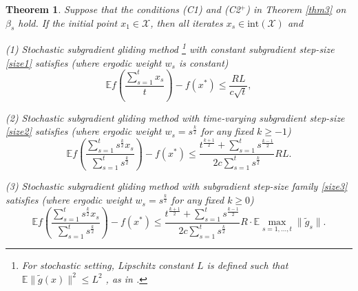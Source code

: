 \documentclass[sn-mathphys]{JORSC-jnl}%
\theoremstyle{thmstyleone}%
\newtheorem{theorem}{Theorem}[section]%
\theoremstyle{thmstylethree}%
\begin{document}
\begin{theorem}\label{thm5}
	Suppose that the conditions (C1) and (C2$^+$) in Theorem \ref{thm3} on $\beta_s$ hold. If the initial point $x_1 \in \mathcal{X}$, then all iterates $x_s \in \text{int}(\mathcal{X})$ and
	
	(1) Stochastic subgradient gliding method \footnote{For stochastic setting, Lipschitz constant $L$ is defined such that $\mathbb{E}\|\tilde{g}(x)\|^2 \le L^2$ , as in \cite{bubeck2015convex}.} with constant subgradient step-size \eqref{size1} satisfies (where ergodic weight $w_s$ is constant)   
	\begin{equation}\label{WeakConvergence4}
		\mathbb{E}f\left(\frac{\sum_{s=1}^t x_s}{t}\right)-f(x^*)\leq \frac{RL}{c\sqrt{t}},
	\end{equation}
	
	(2) Stochastic subgradient gliding method with time-varying subgradient step-size \eqref{size2} satisfies (where ergodic weight $w_s = s^{\frac{k}{2}}$ for any fixed $k \geq -1$)
	\begin{equation}\label{WeakConvergence5}
		\mathbb{E}f\left( \frac{\sum_{s=1}^t s^{\frac{k}{2}} x_s}{\sum_{s=1}^t s^{\frac{k}{2}}} \right) - f(x^*)
		\leq \frac{t^{\frac{k+1}{2}} +\sum_{s=1}^{t} s^{\frac{k-1}{2}}}{2c\sum_{s=1}^{t} s^{\frac{k}{2}}} RL.
	\end{equation}
	
	(3) Stochastic subgradient gliding method with subgradient step-size family \eqref{size3} satisfies (where ergodic weight $w_s = s^{\frac{k}{2}}$ for any fixed $k \geq 0$)
	\begin{equation}\label{WeakConvergence6}
		\mathbb{E}f\left( \frac{\sum_{s=1}^t s^{\frac{k}{2}} x_s}{\sum_{s=1}^t s^{\frac{k}{2}}} \right) - f(x^*)
		\leq \frac{t^{\frac{k+1}{2}} +\sum_{s=1}^{t} s^{\frac{k-1}{2}}}{2c\sum_{s=1}^{t} s^{\frac{k}{2}}} R\cdot\mathbb{E}\max\limits_{s=1,\dots,t}{\|\tilde{g}_s\|}.
	\end{equation}
\end{theorem}
\end{document}
